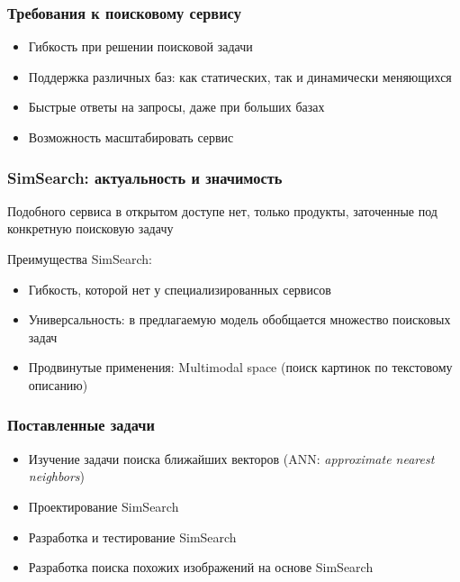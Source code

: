 \documentclass{beamer}
\begin{document}
\begin{frame}

\frametitle{Требования к поисковому сервису}

\begin{itemize}
\item Гибкость при решении поисковой задачи 
\item Поддержка различных баз: как статических, так и динамически меняющихся
\item Быстрые ответы на запросы, даже при больших базах
\item Возможность масштабировать сервис
\end{itemize}

\end{frame}

\begin{frame}
\frametitle{SimSearch: актуальность и значимость}

Подобного сервиса в открытом доступе нет, только продукты, заточенные под конкретную поисковую задачу

\hfill

Преимущества SimSearch:

\begin{itemize}
\item Гибкость, которой нет у специализированных сервисов
\item Универсальность: в предлагаемую модель обобщается множество поисковых задач
\item Продвинутые применения: Multimodal space (поиск картинок по текстовому описанию)
\end{itemize}

\end{frame}

\begin{frame}

\frametitle{Поставленные задачи}

\begin{itemize}
\item Изучение задачи поиска ближайших векторов (ANN: \textit{approximate nearest neighbors})
\item Проектирование SimSearch
\item Разработка и тестирование SimSearch
\item Разработка поиска похожих изображений на основе SimSearch
\end{itemize}

\end{frame}
\end{document}
